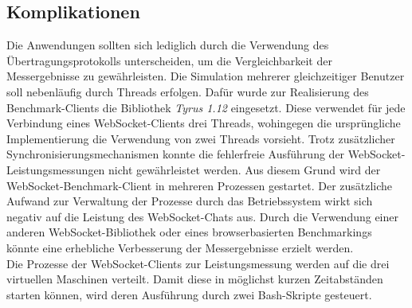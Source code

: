 \documentclass[11pt,a4paper,titlepage]{scrartcl}
\numberwithin{equation}{section}
\begin{document}
\subsection{Komplikationen} \label{subsec:EvalKompl}
Die Anwendungen sollten sich lediglich durch die Verwendung des Übertragungsprotokolls unterscheiden, um die Vergleichbarkeit der Messergebnisse zu gewährleisten. Die Simulation mehrerer gleichzeitiger Benutzer soll nebenläufig durch Threads erfolgen. Dafür wurde zur Realisierung des Benchmark-Clients die  Bibliothek \textit{Tyrus 1.12} eingesetzt. Diese verwendet für jede Verbindung eines WebSocket-Clients drei Threads, wohingegen die ursprüngliche Implementierung die Verwendung von zwei Threads vorsieht. Trotz zusätzlicher Synchronisierungsmechanismen konnte die fehlerfreie Ausführung der WebSocket-Leistungsmessungen nicht gewährleistet werden. Aus diesem Grund wird der WebSocket-Benchmark-Client in mehreren Prozessen gestartet. Der zusätzliche Aufwand zur Verwaltung der Prozesse durch das Betriebssystem wirkt sich negativ auf die Leistung des WebSocket-Chats aus. Durch die Verwendung einer anderen WebSocket-Bibliothek oder eines browserbasierten Benchmarkings könnte eine erhebliche Verbesserung der Messergebnisse erzielt werden. \\

\noindent Die Prozesse der WebSocket-Clients zur Leistungsmessung werden auf die drei virtuellen Maschinen verteilt. Damit diese in möglichst kurzen Zeitabständen starten können, wird deren Ausführung durch zwei Bash-Skripte gesteuert. \\
\end{document}
